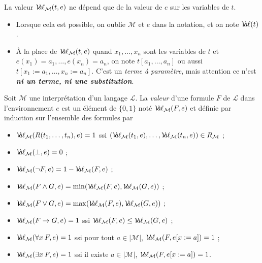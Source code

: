 \documentclass[./main]{subfiles}
\begin{document}
  \begin{lem}
    La valeur $\Val_{\mathcal{M}}(t, e)$ ne dépend que de la valeur de $e$ sur les variables de $t$.
  \end{lem}

  \begin{nota}
    \begin{itemize}
      \item Lorsque cela est possible, on oublie $\mathcal{M}$ et $e$ dans la notation, et on note $\Val(t)$.
      \item À la place de  $\Val_{\mathcal{M}}(t,e)$  quand $x_1, \ldots, x_n$ sont les variables de $t$ et $e(x_1) = a_1, \ldots, e(x_n) = a_n$, on note $t[a_1, \ldots, a_n]$ ou aussi~$t[x_1 := a_1, \ldots, x_n := a_n]$.
        C'est un \textit{terme à paramètre}, mais attention ce n'est \textit{\textbf{ni un terme, ni une substitution}}.
    \end{itemize}
  \end{nota}

  \begin{defn}
    Soit $\mathcal{M}$ une interprétation d'un langage $\mathcal{L}$.
    La \textit{valeur} d'une formule $F$ de $\mathcal{L}$ dans l'environnement $e$ est un élément de $\{0,1\}$ noté $\Val_{\mathcal{M}}(F, e)$ et définie par induction sur l'ensemble des formules par 

    {
      \footnotesize
    \begin{itemize}
      \item $\Val_{\mathcal{M}}(R(t_1, \ldots, t_n), e) = 1$  ssi $(\Val_{\mathcal{M}}(t_1, e), \ldots, \Val_{\mathcal{M}}(t_n ,e)) \in R_{\mathcal{M}}$ ;
      \item $\Val_{\mathcal{M}}(\bot, e) = 0$ ;
      \item $\Val_{\mathcal{M}}(\lnot F, e) = 1 - \Val_{\mathcal{M}}(F, e)$ ;
      \item $\Val_{\mathcal{M}}(F \land G, e) = \min(\Val_{\mathcal{M}}(F, e), \Val_{\mathcal{M}}(G, e))$ ;
      \item $\Val_{\mathcal{M}}(F \lor G, e) = \max(\Val_{\mathcal{M}}(F, e), \Val_{\mathcal{M}}(G, e))$ ;
      \item $\Val_{\mathcal{M}}(F \to G, e) = 1$ ssi $\Val_{\mathcal{M}}(F, e) \le \Val_{\mathcal{M}}(G, e)$ ;
      \item $\Val_{\mathcal{M}}(\forall x\:F, e) = 1$ ssi pour tout $a \in |\mathcal{M}|$, $\Val_{\mathcal{M}}(F, e[x := a]) = 1$ ;
      \item $\Val_{\mathcal{M}}(\exists x\:F, e) = 1$ ssi il existe $a \in |\mathcal{M}|$, $\Val_{\mathcal{M}}(F, e[x := a]) = 1$.
    \end{itemize}
    }
  \end{defn}
\end{document}

